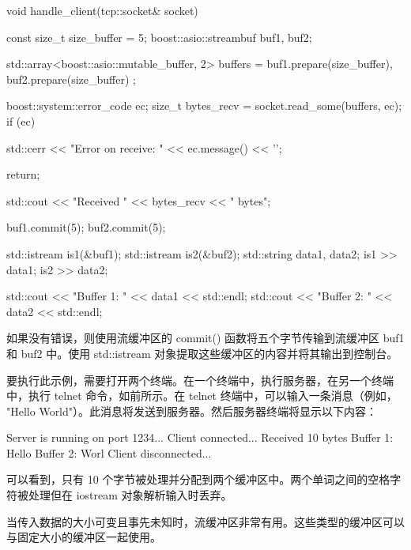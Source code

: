 \begin{cpp}
void handle_client(tcp::socket& socket) {
    const size_t size_buffer = 5;
    boost::asio::streambuf buf1, buf2;

    std::array<boost::asio::mutable_buffer, 2> buffers = {
        buf1.prepare(size_buffer),
        buf2.prepare(size_buffer)
    };

    boost::system::error_code ec;
    size_t bytes_recv = socket.read_some(buffers, ec);
    if (ec) {
        std::cerr << "Error on receive: "
                  << ec.message() << '\n';

        return;
    }

    std::cout << "Received " << bytes_recv << " bytes\n";

    buf1.commit(5);
    buf2.commit(5);

    std::istream is1(&buf1);
    std::istream is2(&buf2);
    std::string data1, data2;
    is1 >> data1;
    is2 >> data2;

    std::cout << "Buffer 1: " << data1 << std::endl;
    std::cout << "Buffer 2: " << data2 << std::endl;
}
\end{cpp}

如果没有错误，则使用流缓冲区的 commit() 函数将五个字节传输到流缓冲区 buf1 和 buf2 中。使用 std::istream 对象提取这些缓冲区的内容并将其输出到控制台。

要执行此示例，需要打开两个终端。在一个终端中，执行服务器，在另一个终端中，执行 telnet 命令，如前所示。在 telnet 终端中，可以输入一条消息（例如， "Hello World"）。此消息将发送到服务器。然后服务器终端将显示以下内容：

\begin{shell}
Server is running on port 1234...
Client connected...
Received 10 bytes
Buffer 1: Hello
Buffer 2: Worl
Client disconnected...
\end{shell}

可以看到，只有 10 个字节被处理并分配到两个缓冲区中。两个单词之间的空格字符被处理但在 iostream 对象解析输入时丢弃。

当传入数据的大小可变且事先未知时，流缓冲区非常有用。这些类型的缓冲区可以与固定大小的缓冲区一起使用。



























